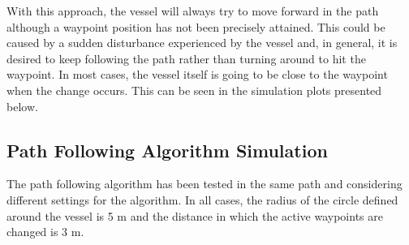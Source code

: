 With this approach, the vessel will always try to move forward in the path although a waypoint position has not been precisely attained. %
This could be caused by a sudden disturbance experienced by the vessel and, in general, it is desired to keep following the path rather than turning around to hit the waypoint. In most cases, the vessel itself is going to be close to the waypoint when the change occurs. This can be seen in the simulation plots presented below. 

\subsection{Path Following Algorithm Simulation}
The path following algorithm has been tested in the same path and considering different settings for the algorithm. In all cases, the radius of the circle defined around the vessel is 5 m and the distance in which the active waypoints are changed is 3 m. 

